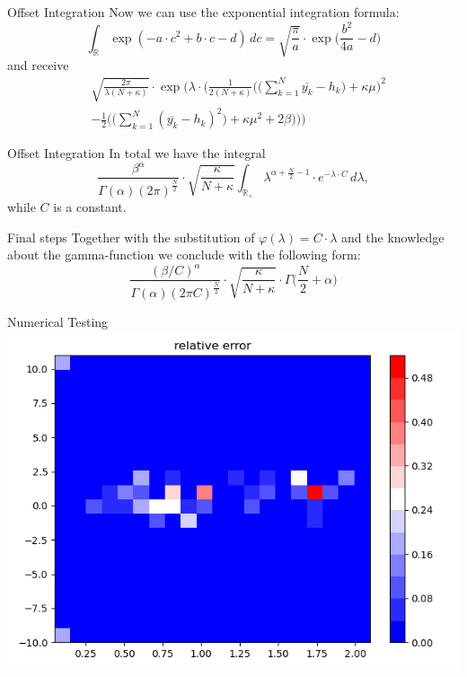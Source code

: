 \documentclass{beamer}
\newcommand{\R}{\mathbb{R}}
\begin{document}
  	\begin{frame}{Offset Integration}
  		Now we can use the exponential integration formula:
  		\[
  			\int_\R \exp(-a \cdot c^2 + b \cdot c - d) \, dc = \sqrt{\frac{\pi}					{a}} \cdot \exp \biggl( \frac{b^2}{4a} - d \biggr)
  		\]
  		and receive
  		\begin{align}
  			& \sqrt{\frac{2 \pi}{\lambda(N + \kappa)}} \cdot \exp \Biggl( \lambda 				\cdot \Biggl( \frac{1}{2(N + \kappa)} \Biggl(\Biggl(\sum_{k = 1}^N 					\overline{y_k} - h_k\Biggr)+ \kappa \mu \Biggr)^2 \\
    		&- \frac{1}{2}\Biggl( \Biggl( \sum_{k = 1}^N (\overline{y_k} - h_k)^2 				\Biggr) + \kappa \mu^2 + 2\beta \Biggr) \Biggr) \Biggr)
  		\end{align}
  	\end{frame}
  	
  	\begin{frame}{Offset Integration}
  		In total we have the integral
  			\[
  				\frac{\beta^\alpha}{\Gamma(\alpha) (2\pi)^{\frac{N}{2}}} \cdot 						\sqrt{\frac{\kappa}{N + \kappa}} \int_{\R_+} \lambda^{\alpha + 						\frac{N}{2} - 1} \cdot e^{-\lambda \cdot C} \, d\lambda,
  			\]
  		while $C$ is a constant.
  	\end{frame}
  	
  	\begin{frame}{Final steps}
  		Together with the substitution of $\varphi (\lambda) = C \cdot \lambda$ 			and the knowledge about the gamma-function we conclude with the following 			form:
  		\[
  			\frac{(\beta / C)^\alpha}{\Gamma(\alpha) (2\pi C)^{\frac{N}{2}}} \cdot 			\sqrt{\frac{\kappa}{N + \kappa}} \cdot \Gamma \biggl(\frac{N}{2} + 					\alpha \biggr)
  		\]
   	\end{frame}
   	
   	\begin{frame}{Numerical Testing}
   		\includegraphics[scale=0.45]{relative_error.png}
   	\end{frame}
   	
\end{document}

